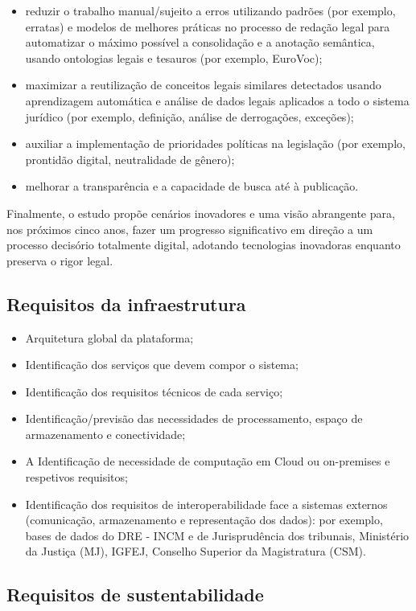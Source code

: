 \begin{itemize}

\item reduzir o trabalho manual/sujeito a erros utilizando padrões (por exemplo, erratas) e modelos 
de melhores práticas no processo de redação legal para automatizar o máximo possível a consolidação 
e a anotação semântica, usando ontologias legais e tesauros (por exemplo, EuroVoc);
\item maximizar a reutilização de conceitos legais similares detectados usando aprendizagem automática 
e análise de dados legais aplicados a todo o sistema jurídico (por exemplo, definição, 
análise de derrogações, exceções);
\item auxiliar a implementação de prioridades políticas na legislação (por exemplo, prontidão digital, 
neutralidade de gênero); 
\item melhorar a transparência e a capacidade de busca até à publicação.

\end{itemize}

Finalmente, o estudo propõe cenários inovadores e uma visão abrangente para, nos próximos cinco anos, 
fazer um progresso significativo em direção a um processo decisório totalmente digital, 
adotando tecnologias inovadoras enquanto preserva o rigor legal.


\subsection{Requisitos da infraestrutura}

\begin{itemize}
\item Arquitetura global da plataforma;
\item Identificação dos serviços que devem compor o sistema;
\item Identificação dos requisitos técnicos de cada serviço;
\item Identificação/previsão das necessidades de processamento, espaço de armazenamento e
conectividade;
\item A Identificação de necessidade de computação em Cloud ou on-premises e respetivos
requisitos;
\item Identificação dos requisitos de interoperabilidade face a sistemas externos (comunicação,
armazenamento e representação dos dados): por exemplo, bases de dados do DRE - INCM e
de Jurisprudência dos tribunais, Ministério da Justiça (MJ), IGFEJ, 
Conselho Superior da Magistratura (CSM).
\end{itemize}


\subsection{Requisitos de sustentabilidade}



